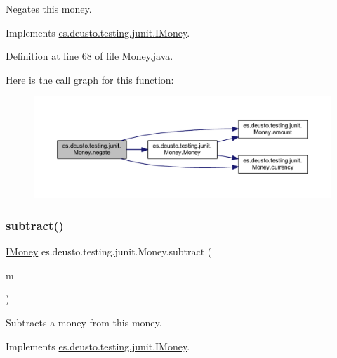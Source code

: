 Negates this money. 

Implements \mbox{\hyperlink{interfacees_1_1deusto_1_1testing_1_1junit_1_1_i_money_a741967d7aa89055b6873619303b11385}{es.\+deusto.\+testing.\+junit.\+I\+Money}}.



Definition at line 68 of file Money.\+java.

Here is the call graph for this function\+:
\nopagebreak
\begin{figure}[H]
\begin{center}
\leavevmode
\includegraphics[width=350pt]{classes_1_1deusto_1_1testing_1_1junit_1_1_money_ae5f0bc3ea87f1fd55d6478653b8f2e36_cgraph}
\end{center}
\end{figure}
\mbox{\label{classes_1_1deusto_1_1testing_1_1junit_1_1_money_aada973cd1a31410ed2b7e5d2ae6bc2e9}} 
\subsubsection{\texorpdfstring{subtract()}{subtract()}}
{\footnotesize\ttfamily \mbox{\hyperlink{interfacees_1_1deusto_1_1testing_1_1junit_1_1_i_money}{I\+Money}} es.\+deusto.\+testing.\+junit.\+Money.\+subtract (\begin{DoxyParamCaption}\item[{\mbox{\hyperlink{interfacees_1_1deusto_1_1testing_1_1junit_1_1_i_money}{I\+Money}}}]{m }\end{DoxyParamCaption})}

Subtracts a money from this money. 

Implements \mbox{\hyperlink{interfacees_1_1deusto_1_1testing_1_1junit_1_1_i_money_a1fb4981aa759e3fe0679654bec7a8b61}{es.\+deusto.\+testing.\+junit.\+I\+Money}}.



